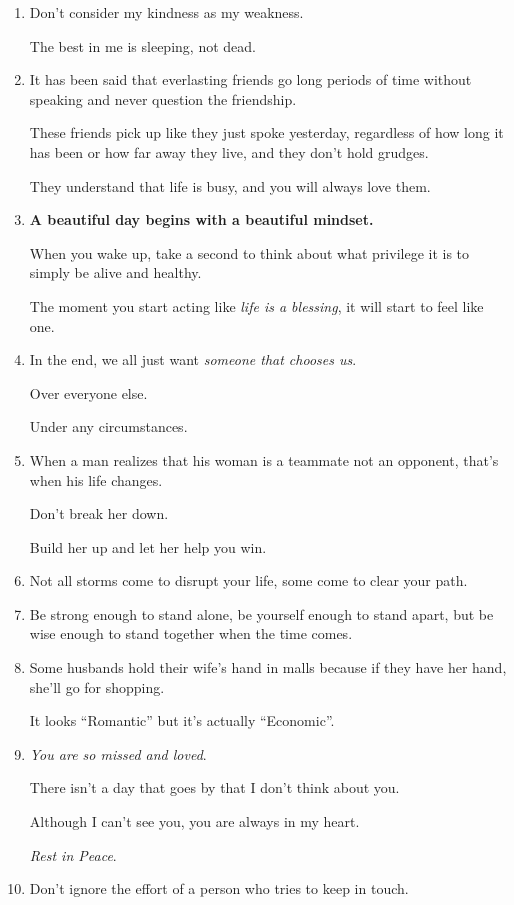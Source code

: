 \documentclass{article}
\numberwithin{equation}{section}
\begin{document}
\begin{enumerate}
    \textit{No arguing}.
    \item Don't consider my kindness as my weakness.
    
    The best in me is sleeping, not dead.
    \item It has been said that everlasting friends go long periods of time without speaking and never question the friendship.
    
    These friends pick up like they just spoke yesterday, regardless of how long it has been or how far away they live, and they don't hold grudges.
    
    They understand that life is busy, and you will always love them.
    \item \textbf{A beautiful day begins with a beautiful mindset.}
    
    When you wake up, take a second to think about what privilege it is to simply be alive and healthy.
    
    The moment you start acting like \textit{life is a blessing}, it will start to feel like one.
    \item In the end, we all just want \textit{someone that chooses us}.
    
    Over everyone else.
    
    Under any circumstances.
    \item When a man realizes that his woman is a teammate not an opponent, that's when his life changes.
    
    Don't break her down.
    
    Build her up and let her help you win.
    \item Not all storms come to disrupt your life, some come to clear your path.
    \item Be strong enough to stand alone, be yourself enough to stand apart, but be wise enough to stand together when the time comes.
    \item Some husbands hold their wife's hand in malls because if they have her hand, she'll go for shopping.
    
    It looks ``Romantic'' but it's actually ``Economic''.
    \item \textit{You are so missed and loved}.
    
    There isn't a day that goes by that I don't think about you.
    
    Although I can't see you, you are always in my heart.
    
    \textit{Rest in Peace}.
    \item Don't ignore the effort of a person who tries to keep in touch.
    

\end{enumerate}
\end{document}
